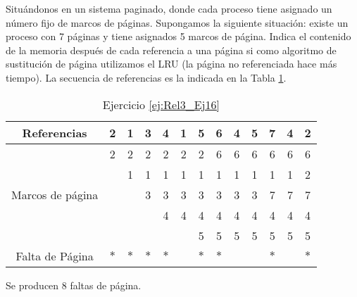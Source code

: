\begin{ejercicio} \label{ej:Rel3_Ej16}
    Situándonos en un sistema paginado, donde cada proceso tiene asignado un número fijo
de marcos de páginas. Supongamos la siguiente situación: existe un proceso con 7
páginas y tiene asignados 5 marcos de página. Indica el contenido de la memoria
después de cada referencia a una página si como algoritmo de sustitución de página
utilizamos el LRU (la página no referenciada hace más tiempo). La secuencia de
referencias es la indicada en la Tabla \ref{tab:Rel3_Ej16}.

    \begin{table}[H]
        \centering
        \begin{tabular}{c||c|c|c|c|c|c|c|c|c|c|c|c|}
        Referencias                       & 2 & 1 & 3 & 4 & 1 & 5 & 6 & 4 & 5 & 7 & 4 & \multicolumn{1}{c|}{2} \\ \hline \hline
        \multirow{5}{*}{Marcos de página} & 2 & 2 & 2 & 2 & 2 & 2 & 6 & 6 & 6 & 6 & 6 & \multicolumn{1}{c|}{6} \\ \cline{2-13} 
                                        &   & 1 & 1 & 1 & 1 & 1 & 1 & 1 & 1 & 1 & 1 & \multicolumn{1}{c|}{2} \\ \cline{2-13} 
                                        &   &   & 3 & 3 & 3 & 3 & 3 & 3 & 3 & 7 & 7 & \multicolumn{1}{c|}{7} \\ \cline{2-13} 
                                        &   &   &   & 4 & 4 & 4 & 4 & 4 & 4 & 4 & 4 & \multicolumn{1}{c|}{4} \\ \cline{2-13} 
                                        &   &   &   &   &   & 5 & 5 & 5 & 5 & 5 & 5 & \multicolumn{1}{c|}{5} \\ \hline
        Falta de Página                   & $\ast$ & $\ast$ & $\ast$ & $\ast$ &   & $\ast$ & $\ast$ &   &   & $\ast$ &   & $\ast$                     
        \end{tabular}
        \caption{Ejercicio \ref{ej:Rel3_Ej16}}
        \label{tab:Rel3_Ej16}
    \end{table}
    
    Se producen 8 faltas de página.

\end{ejercicio}



